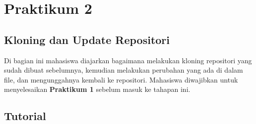 \documentclass[a4paper, 12pt]{report}
\begin{document}

\chapter{Praktikum 2}
	\section{Kloning dan Update Repositori}
	Di bagian ini mahasiswa diajarkan bagaimana melakukan kloning repositori yang sudah dibuat sebelumnya, kemudian melakukan perubahan yang ada di dalam file, dan mengunggahnya kembali ke repositori. Mahasiswa diwajibkan untuk menyelesaikan \textbf{Praktikum 1} sebelum masuk ke tahapan ini.
	
	\section{Tutorial}
\end{document}
